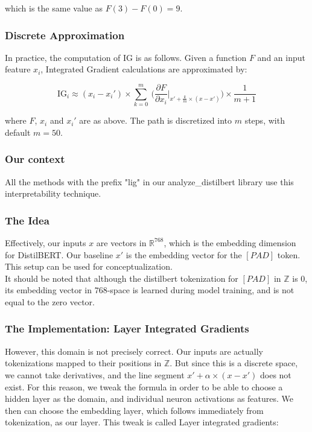 \documentclass{article}
\begin{document}
\noindent which is the same value as $F(3) - F(0) = 9$.  \\

\subsubsection{Discrete Approximation}

In practice, the computation of IG is as follows.  Given a function $F$ and an input feature $x_i$, Integrated Gradient calculations are approximated by:

\begin{equation}
\text{IG}_i \approx (x_i - x_i') \times \sum_{k=0}^{m} \ \bigg( \frac{\partial F}{\partial x_i} \Big|_{x' + \frac{k}{m} \times (x - x')} \bigg) \times \frac{1}{m+1}
\end{equation}

\noindent where $F$, $x_i$ and $x_i'$ are as above.  The path is discretized into $m$ steps, with default $m = 50$.


\subsubsection{Our context}

All the methods with the prefix "lig" in our analyze\_distilbert library use this interpretability technique.

\subsubsection*{The Idea}

Effectively, our inputs $x$ are vectors in $\mathbb{R}^{768}$, which is the embedding dimension for DistilBERT.  Our baseline $x'$ is the embedding vector for the $[PAD]$ token.  This setup can be used for conceptualization. \\

It should be noted that although the distilbert tokenization for $[PAD]$ in $\mathbb{Z}$ is $0$, its embedding vector in $768$-space is learned during model training, and is not equal to the zero vector.

\subsubsection*{The Implementation: Layer Integrated Gradients}

However, this domain is not precisely correct.  Our inputs are actually tokenizations mapped to their positions in $\mathbb{Z}$.  But since this is a discrete space, we cannot take derivatives, and the line segment $x' + \alpha \times (x - x')$ does not exist.  For this reason, we tweak the formula in order to be able to choose a hidden layer as the domain, and individual neuron activations as features.  We then can choose the embedding layer, which follows immediately from tokenization, as our layer.  This tweak is called Layer integrated gradients:
\end{document}
